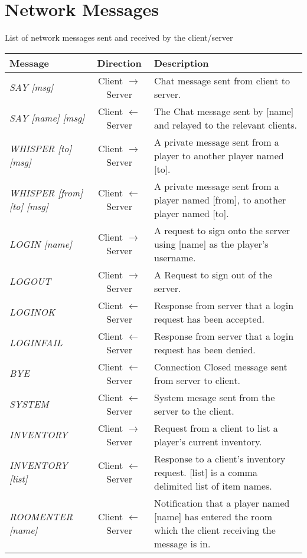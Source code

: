 \documentclass[a4paper]{article}
\begin{document}
\section{Network Messages}\label{app:NetworkMessages}
List of network messages sent and received by the client/server
\begin{longtable}{|l|c|p{8 cm}|}
\hline
Message & Direction & Description\\
\hline
\endhead
\textit{SAY [msg]} & Client $\rightarrow$ Server & Chat message sent from client to server.\\
\hline
\textit{SAY [name] [msg]} & Client $\leftarrow$ Server & The Chat message sent by [name] and relayed to the relevant clients.\\
\hline
\textit{WHISPER [to] [msg]} & Client $\rightarrow$ Server & A private message sent from a player to another player named [to].\\
\hline
\textit{WHISPER [from] [to] [msg]} & Client $\leftarrow$ Server & A private message sent from a player named [from], to another player named [to].\\
\hline
\textit{LOGIN [name]} & Client $\rightarrow$ Server & A request to sign onto the server using [name] as the player's username.\\
\hline
\textit{LOGOUT} & Client $\rightarrow$ Server & A Request to sign out of the server.\\
\hline
\textit{LOGINOK} & Client $\leftarrow$ Server & Response from server that a login request has been accepted.\\
\hline
\textit{LOGINFAIL} & Client $\leftarrow$ Server & Response from server that a login request has been denied.\\
\hline
\textit{BYE} & Client $\leftarrow$ Server & Connection Closed message sent from server to client.\\
\hline
\textit{SYSTEM} & Client $\leftarrow$ Server & System mesage sent from the server to the client.\\
\hline
\textit{INVENTORY} & Client $\rightarrow$ Server & Request from a client to list a player's current inventory.\\
\hline
\textit{INVENTORY [list]} & Client $\leftarrow$ Server & Response to a client's inventory request. [list] is a comma delimited list of item names.\\
\hline
\textit{ROOMENTER [name]} & Client $\leftarrow$ Server & Notification that a player named [name] has entered the room which the client receiving the message is in.\\

\end{longtable}
\end{document}
